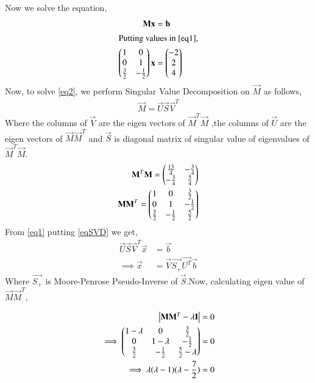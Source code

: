 \documentclass[journal,12pt,twocolumn]{IEEEtran}
\begin{document}
Now we solve the equation,
\begin{align}
\mathbf{M}\mathbf{x} &= \mathbf{b}\label{eq1}\\
\intertext{Putting values in \eqref{eq1},}
\begin{pmatrix}1&0\\0&1\\ \frac{3}{2}& -\frac{1}{2}\end{pmatrix}\mathbf{x} &= \begin{pmatrix}-2\\2\\4\end{pmatrix}\label{eq2}
\end{align}
Now, to solve \eqref{eq2}, we perform Singular Value Decomposition on $\vec{M}$ as follows,
\begin{align}
\vec{M}=\vec{U}\vec{S}\vec{V}^T\label{eqSVD}
\end{align}
Where the columns of $\vec{V}$ are the eigen vectors of $\vec{M}^T\vec{M}$ ,the columns of $\vec{U}$ are the eigen vectors of $\vec{M}\vec{M}^T$ and $\vec{S}$ is diagonal matrix of singular value of eigenvalues of $\vec{M}^T\vec{M}$.
\begin{align}
\mathbf{M}^T\mathbf{M}=\begin{pmatrix}\frac{13}{4}& -\frac{3}{4}\\ -\frac{3}{4}&\frac{5}{4}\end{pmatrix}\label{eqMTM}\\
\mathbf{M}\mathbf{M}^T=\begin{pmatrix}1&0& \frac{3}{2}\\0&1& -\frac{1}{2}\\ \frac{3}{2}&-\frac{1}{2}& \frac{5}{2}\end{pmatrix}
\end{align}
From \eqref{eq1} putting \eqref{eqSVD} we get,
\begin{align}
\vec{U}\vec{S}\vec{V}^T\vec{x} & = \vec{b}\\
\implies\vec{x} &= \vec{V}\vec{S_+}\vec{U^T}\vec{b}\label{eqX}
\end{align}
Where $\vec{S_+}$ is Moore-Penrose Pseudo-Inverse of $\vec{S}$.Now, calculating eigen value of $\vec{M}\vec{M}^T$,


\begin{align}
\begin{vmatrix}\mathbf{M}\mathbf{M}^T - \lambda\mathbf{I}\end{vmatrix} &= 0\\
\implies\begin{pmatrix}1-\lambda&0& \frac{3}{2} \\0&1-\lambda& -\frac{1}{2}\\   \frac{3}{2}& -\frac{1}{2}&\frac{5}{2}-\lambda\end{pmatrix} &=0\\
\implies\lambda (\lambda - 1)(\lambda - \frac{7}{2}) &=0
\end{align}
\end{document}
